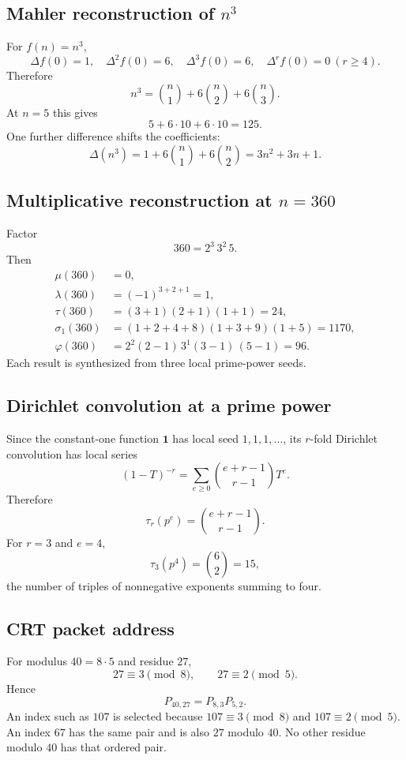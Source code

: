 \documentclass[11pt]{article}
\theoremstyle{definition}\newtheorem{definition}[theorem]{Definition}\newtheorem{example}[theorem]{Example}\newtheorem{construction}[theorem]{Construction}\newtheorem{algorithm}[theorem]{Algorithm}\newtheorem{conjecture}[theorem]{Conjecture}\newtheorem{problem}[theorem]{Problem}
\theoremstyle{remark}\newtheorem{remark}[theorem]{Remark}\newtheorem{boundary}[theorem]{Boundary}\newtheorem{certificate}[theorem]{Computational Certificate}\newtheorem{classical}[theorem]{Classical Input}\newtheorem{principle}[theorem]{Structural Principle}
\begin{document}
\subsection{Mahler reconstruction of \texorpdfstring{$n^3$}{n cubed}}
For $f(n)=n^3$,
\[
 \Delta f(0)=1,
 \quad
 \Delta^2f(0)=6,
 \quad
 \Delta^3f(0)=6,
 \quad
 \Delta^rf(0)=0\ (r\geq4).
\]
Therefore
\[
 \boxed{n^3=\binom n1+6\binom n2+6\binom n3.}
\]
At $n=5$ this gives
\[
 5+6\cdot10+6\cdot10=125.
\]
One further difference shifts the coefficients:
\[
 \Delta(n^3)=1+6\binom n1+6\binom n2=3n^2+3n+1.
\]

\subsection{Multiplicative reconstruction at \texorpdfstring{$n=360$}{n=360}}
Factor
\[
 360=2^3\,3^2\,5.
\]
Then
\[
\begin{aligned}
 \mu(360)&=0,\\
 \lambda(360)&=(-1)^{3+2+1}=1,\\
 \tau(360)&=(3+1)(2+1)(1+1)=24,\\
 \sigma_1(360)&=(1+2+4+8)(1+3+9)(1+5)=1170,\\
 \varphi(360)&=2^{2}(2-1)\,3^{1}(3-1)\,(5-1)=96.
\end{aligned}
\]
Each result is synthesized from three local prime-power seeds.

\subsection{Dirichlet convolution at a prime power}
Since the constant-one function $\mathbf1$ has local seed $1,1,1,\ldots$, its $r$-fold Dirichlet convolution has local series
\[
 (1-T)^{-r}=\sum_{e\geq0}\binom{e+r-1}{r-1}T^e.
\]
Therefore
\[
 \tau_r(p^e)=\binom{e+r-1}{r-1}.
\]
For $r=3$ and $e=4$,
\[
 \tau_3(p^4)=\binom62=15,
\]
the number of triples of nonnegative exponents summing to four.

\subsection{CRT packet address}
For modulus $40=8\cdot5$ and residue $27$,
\[
 27\equiv3\pmod8,
 \qquad
 27\equiv2\pmod5.
\]
Hence
\[
 P_{40,27}=P_{8,3}P_{5,2}.
\]
An index such as $107$ is selected because $107\equiv3\pmod8$ and $107\equiv2\pmod5$.  An index $67$ has the same pair and is also $27$ modulo $40$.  No other residue modulo $40$ has that ordered pair.
\end{document}
